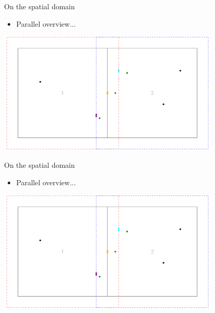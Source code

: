 \documentclass{beamer}
\begin{document}
     \begin{frame}{On the spatial domain}
        \begin{itemize} \item Parallel overview... \end{itemize} \vspace{0.5cm}

         \centering
         \includegraphics[page=3,width=0.8\textwidth]{figures/merge}
     \end{frame}

     \begin{frame}{On the spatial domain}
        \begin{itemize} \item Parallel overview... \end{itemize} \vspace{0.5cm}

         \centering
         \includegraphics[page=4,width=0.8\textwidth]{figures/merge}
     \end{frame}
\end{document}
